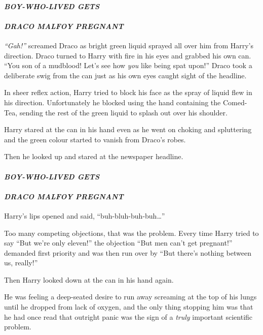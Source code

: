 \paragraph{\emph{BOY-WHO-LIVED GETS}}\label{boy-who-lived-gets}

\paragraph{\emph{DRACO MALFOY PREGNANT}}\label{draco-malfoy-pregnant}

\emph{``Gah!''} screamed Draco as bright green liquid sprayed all over
him from Harry's direction. Draco turned to Harry with fire in his eyes
and grabbed his own can. ``You son of a mudblood! Let's see how
\emph{you} like being spat upon!'' Draco took a deliberate swig from the
can just as his own eyes caught sight of the headline.

In sheer reflex action, Harry tried to block his face as the spray of
liquid flew in his direction. Unfortunately he blocked using the hand
containing the Comed-Tea, sending the rest of the green liquid to splash
out over his shoulder.

Harry stared at the can in his hand even as he went on choking and
spluttering and the green colour started to vanish from Draco's robes.

Then he looked up and stared at the newspaper headline.

\paragraph{\emph{BOY-WHO-LIVED GETS}}\label{boy-who-lived-gets-1}

\paragraph{\emph{DRACO MALFOY PREGNANT}}\label{draco-malfoy-pregnant-1}

Harry's lips opened and said, ``buh-bluh-buh-buh\ldots{}''

Too many competing objections, that was the problem. Every time Harry
tried to say ``But we're only eleven!'' the objection ``But men can't
get pregnant!'' demanded first priority and was then run over by ``But
there's nothing between us, really!''

Then Harry looked down at the can in his hand again.

He was feeling a deep-seated desire to run away screaming at the top of
his lungs until he dropped from lack of oxygen, and the only thing
stopping him was that he had once read that outright panic was the sign
of a \emph{truly} important scientific problem.

